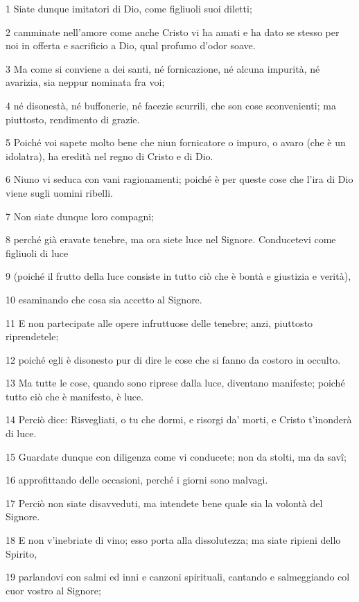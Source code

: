 \par 1 Siate dunque imitatori di Dio, come figliuoli suoi diletti;
\par 2 camminate nell'amore come anche Cristo vi ha amati e ha dato se stesso per noi in offerta e sacrificio a Dio, qual profumo d'odor soave.
\par 3 Ma come si conviene a dei santi, né fornicazione, né alcuna impurità, né avarizia, sia neppur nominata fra voi;
\par 4 né disonestà, né buffonerie, né facezie scurrili, che son cose sconvenienti; ma piuttosto, rendimento di grazie.
\par 5 Poiché voi sapete molto bene che niun fornicatore o impuro, o avaro (che è un idolatra), ha eredità nel regno di Cristo e di Dio.
\par 6 Niuno vi seduca con vani ragionamenti; poiché è per queste cose che l'ira di Dio viene sugli uomini ribelli.
\par 7 Non siate dunque loro compagni;
\par 8 perché già eravate tenebre, ma ora siete luce nel Signore. Conducetevi come figliuoli di luce
\par 9 (poiché il frutto della luce consiste in tutto ciò che è bontà e giustizia e verità),
\par 10 esaminando che cosa sia accetto al Signore.
\par 11 E non partecipate alle opere infruttuose delle tenebre; anzi, piuttosto riprendetele;
\par 12 poiché egli è disonesto pur di dire le cose che si fanno da costoro in occulto.
\par 13 Ma tutte le cose, quando sono riprese dalla luce, diventano manifeste; poiché tutto ciò che è manifesto, è luce.
\par 14 Perciò dice: Risvegliati, o tu che dormi, e risorgi da' morti, e Cristo t'inonderà di luce.
\par 15 Guardate dunque con diligenza come vi conducete; non da stolti, ma da savî;
\par 16 approfittando delle occasioni, perché i giorni sono malvagi.
\par 17 Perciò non siate disavveduti, ma intendete bene quale sia la volontà del Signore.
\par 18 E non v'inebriate di vino; esso porta alla dissolutezza; ma siate ripieni dello Spirito,
\par 19 parlandovi con salmi ed inni e canzoni spirituali, cantando e salmeggiando col cuor vostro al Signore;
